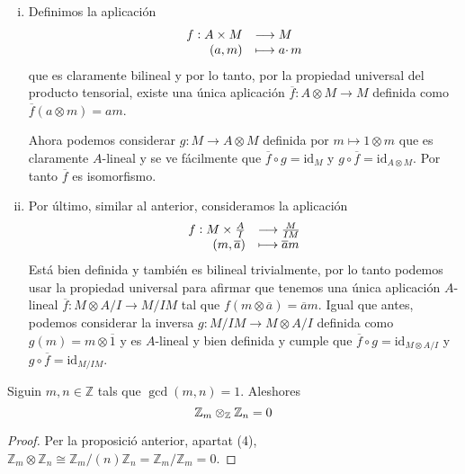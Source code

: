 \documentclass[../../../main.tex]{subfiles}
\begin{document}
\begin{sol}
\begin{enumerate}[(i)]
    
    \item Definimos la aplicación
    \begin{equation}
        \notag
        \begin{array}{rl}
            f:A\times M & \longrightarrow M \\
            (a,m) & \longmapsto a\cdotp m
        \end{array}
    \end{equation}
    que es claramente bilineal y por lo tanto, por la propiedad universal del producto tensorial, existe una única aplicación $\overline{f}:A\otimes M\to M$ definida como $\overline{f}(a\otimes m) = am$.
    
    Ahora podemos considerar $g:M\to A\otimes M$ definida por $m\mapsto 1\otimes m$ que es claramente $A$-lineal y se ve fácilmente que $\overline{f}\circ g = \mathrm{id}_M$ y $g\circ\overline{f} = \mathrm{id}_{A\otimes M}$. Por tanto $\overline{f}$ es isomorfismo.
    
    
    
    \item Por último, similar al anterior, consideramos la aplicación
    \begin{equation}
        \notag
        \begin{array}{rl}
            f:M\times \frac{A}{I} & \longrightarrow \frac{M}{IM} \\
            (m,\overline{a}) & \longmapsto \overline{a}m
        \end{array}
    \end{equation}
    Está bien definida y también es bilineal trivialmente, por lo tanto podemos usar la propiedad universal para afirmar que tenemos una única aplicación $A$-lineal $\overline{f}:M\otimes A/I\to M/IM$ tal que $f(m\otimes\overline{a}) = \overline{a}m$. Igual que antes, podemos considerar la inversa $g:M/IM\to M\otimes A/I$ definida como $g(m) = m\otimes \overline{1}$ y es $A$-lineal y bien definida y cumple que $\overline{f}\circ g = \mathrm{id}_{M\otimes A/I}$ y $g\circ\overline{f} = \mathrm{id}_{M/IM}$.
\end{enumerate}
\end{sol}


\begin{coro}
Siguin $m,n\in\mathbb{Z}$ tals que $\gcd(m,n) = 1$. Aleshores
\begin{equation}
    \notag
    \mathbb{Z}_m\otimes_\mathbb{Z}\mathbb{Z}_n = 0
\end{equation}
\end{coro}
\begin{proof}
Per la proposició anterior, apartat (4),  $\mathbb{Z}_m\otimes\mathbb{Z}_n\cong\mathbb{Z}_m/(n)\mathbb{Z}_n = \mathbb{Z}_m/\mathbb{Z}_m = 0$.
\end{proof}
\end{document}
